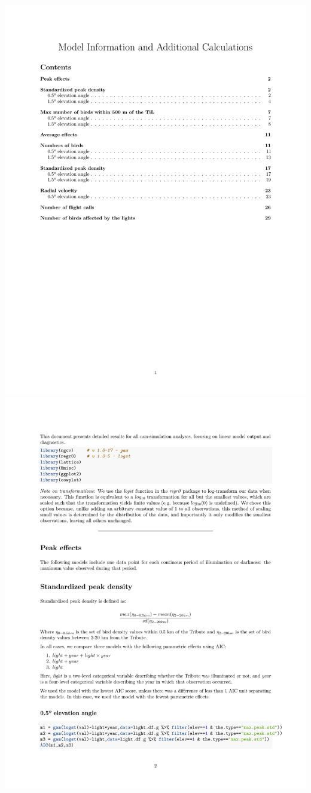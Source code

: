 \documentclass[a4paper, twoside]{templates/ociamthesis}
\begin{document}
\includegraphics[width=1\linewidth]{pdf_chapters/lights/lights_supp_crop_Part35}
\includegraphics[width=1\linewidth]{pdf_chapters/lights/lights_supp_crop_Part36}
\end{document}
